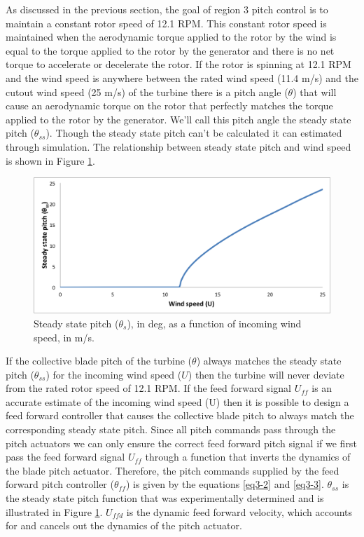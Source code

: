 As discussed in the previous section, the goal of region 3 pitch control is to maintain a constant rotor speed of 12.1 RPM. This constant rotor speed is maintained when the aerodynamic torque applied to the rotor by the wind is equal to the torque applied to the rotor by the generator and there is no net torque to accelerate or decelerate the rotor. If the rotor is spinning at 12.1 RPM and the wind speed is anywhere between the rated wind speed (11.4 m/s) and the cutout wind speed (25 m/s) of the turbine there is a pitch angle ($\theta$) that will cause an aerodynamic torque on the rotor that perfectly matches the torque applied to the rotor by the generator. We'll call this pitch angle the steady state pitch ($\theta_{ss}$). Though the steady state pitch can't be calculated it can estimated through simulation. The relationship between steady state pitch and wind speed is shown in Figure \ref{fig3-11}.

 \begin{figure}[htb]
	\centering
		\includegraphics[width=\linewidth]{Figures/ch3Figures/fig3-11.png}
		
	\caption{Steady state pitch ($\theta_{s}$), in deg, as a function of incoming wind speed, in m/s.}
	\label{fig3-11}
\end{figure}

If the collective blade pitch of the turbine ($\theta$) always matches the steady state pitch ($\theta_{ss}$) for the incoming wind speed ($U$) then the turbine will never deviate from the rated rotor speed of 12.1 RPM. If the feed forward signal $U_{ff}$ is an accurate estimate of the incoming wind speed (U) then it is possible to design a feed forward controller that causes the collective blade pitch to always match the corresponding steady state pitch. Since all pitch commands pass through the pitch actuators we can only ensure the correct feed forward pitch signal if we first pass the feed forward signal $U_{ff}$ through a function that inverts the dynamics of the blade pitch actuator. Therefore, the pitch commands supplied by the feed forward pitch controller ($\theta_{ff}$) is given by the equations \ref{eq3-2} and \ref{eq3-3}. $\theta_{ss}$ is the steady state pitch function that was experimentally determined and is illustrated in Figure \ref{fig3-11}. $U_{ffd}$ is the dynamic feed forward velocity, which accounts for and cancels out the dynamics of the pitch actuator.

